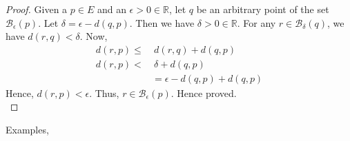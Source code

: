 \begin{proof}
    
    Given a $p \in E$ and an $\epsilon > 0 \in \mathbb{R}$, let $q$ be an arbitrary point of the 
    set $\mathcal{B}_{\epsilon}(p)$. Let $\delta = \epsilon - d(q,p)$. Then we have $\delta > 0 \in
    \mathbb{R}$. For any $r \in \mathcal{B}_{\delta}(q)$, we have $d(r,q) < \delta$. Now, 
    \begin{displaymath}
	\begin{aligned}
	    d(r,p) \leq & \ d(r,q) + d(q,p) \\
	    d(r,p) < & \ \delta + d(q,p) \\
	    & = \epsilon - d(q,p) + d(q,p) 
	\end{aligned}
    \end{displaymath}	
    Hence, $d(r,p) < \epsilon$. Thus, $r \in \mathcal{B}_{\epsilon}(p)$. Hence proved.
    \\
    
\end{proof}
Examples,
